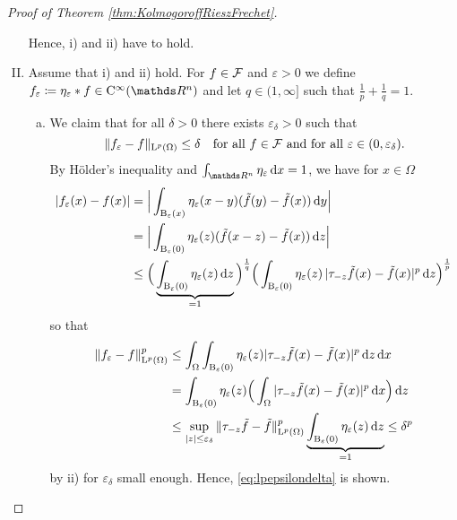 \begin{proof}[Proof of Theorem \ref{thm:KolmogoroffRieszFrechet}]
\begin{enumerate}[I)]
      Hence, i) and ii) have to hold.

    \item 

      Assume that i) and ii) hold.
      For $f \in \mathcal{F}$ and $\varepsilon > 0$ we define $f_\varepsilon \coloneqq \eta_\varepsilon \ast f \in \CC^\infty(\R^n)$ and let $q \in (1,\infty]$ such that $\frac{1}{p} + \frac{1}{q} = 1$.
      \begin{enumerate}[a)]
        \item We claim that for all $\delta > 0$ there exists $\varepsilon_\delta > 0$ such that
          \begin{equation}
          \label{eq:lpepsilondelta}
          \|f_\varepsilon - f\|_{\mathrm{L}^p(\Omega)} \leq \delta \quad\text{for all } f \in \mathcal{F} \text{ and for all } \varepsilon \in (0,\varepsilon_\delta).
        \end{equation}
        By Hölder's inequality and $\int_{\R^n} \eta_\varepsilon \d x = 1$, we have for $x \in \Omega$
        \begin{align*}
          |f_\varepsilon(x) - f(x) | 
          &= \Big| \int_{\mathrm{B}_\varepsilon(x)} \eta_\varepsilon(x - y) (\tilde f (y) - \tilde f(x)) \, {\operatorname{d}\!{y}} \Big| \\
          &= \Big| \int_{\mathrm{B}_\varepsilon(0)} \eta_\varepsilon(z) (\tilde f (x - z) - \tilde f(x)) \, {\operatorname{d}\!{z}} \Big| \\
          &\leq  \Big( \underbrace{\int_{\mathrm{B}_\varepsilon(0)} \eta_\varepsilon(z) \, {\operatorname{d}\!{z}}}_{ = 1} \Big)^{\frac{1}{q}} \Big( \int_{\mathrm{B}_\varepsilon(0)} \eta_\varepsilon(z) \, |\tau_{-z} \tilde f(x) - \tilde f(x)|^p \, {\operatorname{d}\!{z}} \Big)^{\frac{1}{p}}
        \end{align*}
        so that
        \begin{align*}
          \|f_\varepsilon - f\|_{\mathrm{L}^p(\Omega)}^p
          &\leq \int_\Omega \int_{\mathrm{B}_\varepsilon(0)} \eta_\varepsilon(z) | \tau_{-z} \tilde f(x) - \tilde f(x)|^p \, {\operatorname{d}\!{z}} \, {\operatorname{d}\!{x}} \\
          &= \int_{\mathrm{B}_\varepsilon(0)} \eta_\varepsilon(z) \Big(\int_\Omega |\tau_{-z} \tilde f(x) - \tilde f (x) |^p \, {\operatorname{d}\!{x}} \Big) \, {\operatorname{d}\!{z}} \\
          &\leq \sup_{|z| \leq \varepsilon_\delta} \| \tau_{-z} \tilde f - \tilde f \|_{\mathrm{L}^p(\Omega)}^p \underbrace{\int_{\mathrm{B}_\varepsilon(0)} \eta_\varepsilon(z) \, {\operatorname{d}\!{z}}}_{= 1} 
          \leq \delta^p
        \end{align*}
        by ii) for $\varepsilon_\delta$ small enough.
        Hence, \eqref{eq:lpepsilondelta} is shown.


\end{enumerate}
\end{enumerate}
\end{proof}
